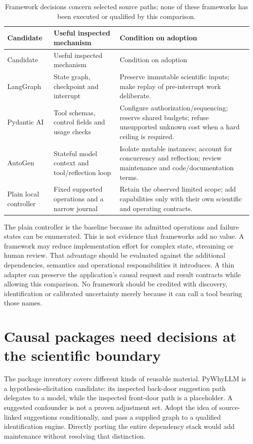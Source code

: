 \begin{longtable}{@{}p{}p{}p{}@{}}
\caption{Framework decisions concern selected source paths; none of these
frameworks has been executed or qualified by this comparison.}\\
\toprule Candidate & Useful inspected mechanism & Condition on adoption\\\midrule
\endfirsthead
\toprule Candidate & Useful inspected mechanism & Condition on adoption\\\midrule
\endhead
LangGraph & State graph, checkpoint and interrupt & Preserve immutable
scientific inputs; make replay of pre-interrupt work deliberate.\\
Pydantic AI & Tool schemas, control fields and usage checks & Configure
authorization/sequencing; reserve shared budgets; refuse unsupported unknown
cost when a hard ceiling is required.\\
AutoGen & Stateful model context and tool/reflection loop & Isolate mutable
instances; account for concurrency and reflection; review maintenance and
code/documentation terms.\\
Plain local controller & Fixed supported operations and a narrow journal &
Retain the observed limited scope; add capabilities only with their own
scientific and operating contracts.\\
\bottomrule
\end{longtable}

The plain controller is the baseline because its admitted operations and
failure states can be enumerated. This is not evidence that frameworks add
no value. A framework may reduce implementation effort for complex state,
streaming or human review. That advantage should be evaluated against the
additional dependencies, semantics and operational responsibilities it
introduces. A thin adapter can preserve the application's causal request
and result contracts while allowing this comparison. No framework should
be credited with discovery, identification or calibrated uncertainty merely
because it can call a tool bearing those names.

\section{Causal packages need decisions at the scientific boundary}

The package inventory covers different kinds of reusable material. PyWhyLLM
is a hypothesis-elicitation candidate: its inspected back-door suggestion
path delegates to a model, while the inspected front-door path is a
placeholder. A suggested confounder is not a proven adjustment set. Adopt
the idea of source-linked suggestions conditionally, and pass a supplied
graph to a qualified identification engine. Directly porting the entire
dependency stack would add maintenance without resolving that distinction.
\citep{v12_la_package_pywhy_llm}

